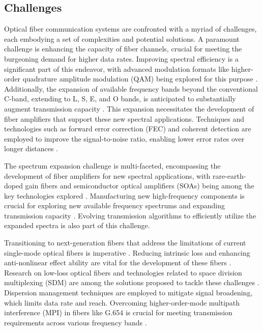 \subsection*{Challenges}

Optical fiber communication systems are confronted with a myriad of challenges, each embodying a set of complexities and potential solutions. A paramount challenge is enhancing the capacity of fiber channels, crucial for meeting the burgeoning demand for higher data rates. Improving spectral efficiency is a significant part of this endeavor, with advanced modulation formats like higher-order quadrature amplitude modulation (QAM) being explored for this purpose \cite{huawei2023}. Additionally, the expansion of available frequency bands beyond the conventional C-band, extending to L, S, E, and O bands, is anticipated to substantially augment transmission capacity \cite{huawei2023}. This expansion necessitates the development of fiber amplifiers that support these new spectral applications. Techniques and technologies such as forward error correction (FEC) and coherent detection are employed to improve the signal-to-noise ratio, enabling lower error rates over longer distances \cite{huawei2023}.

The spectrum expansion challenge is multi-faceted, encompassing the development of fiber amplifiers for new spectral applications, with rare-earth-doped gain fibers and semiconductor optical amplifiers (SOAs) being among the key technologies explored \cite{huawei2023}. Manufacturing new high-frequency components is crucial for exploring new available frequency spectrums and expanding transmission capacity \cite{huawei2023}. Evolving transmission algorithms to efficiently utilize the expanded spectra is also part of this challenge.

Transitioning to next-generation fibers that address the limitations of current single-mode optical fibers is imperative \cite{engineering2023}. Reducing intrinsic loss and enhancing anti-nonlinear effect ability are vital for the development of these fibers \cite{engineering2023}. Research on low-loss optical fibers and technologies related to space division multiplexing (SDM) are among the solutions proposed to tackle these challenges \cite{engineering2023}. Dispersion management techniques are employed to mitigate signal broadening, which limits data rate and reach. Overcoming higher-order-mode multipath interference (MPI) in fibers like G.654 is crucial for meeting transmission requirements across various frequency bands \cite{huawei2023}.

